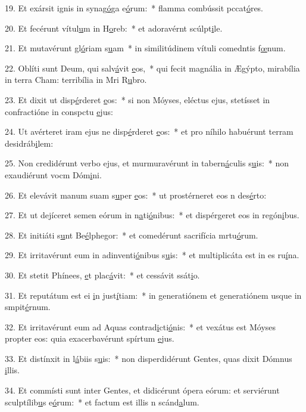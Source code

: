 19. Et exársit ignis in synag\uline{ó}ga e\uline{ó}rum:~* flamma combússit pccat\uline{ó}res.\par 
20. Et fecérunt vítul\uline{u}m in H\uline{o}reb:~* et adoravérnt scúlpt\uline{i}le.\par 
21. Et mutavérunt gl\uline{ó}riam s\uline{u}am~* in similitúdinem vítuli comedntis f\uline{œ}num.\par 
22. Oblíti sunt Deum, qui salv\uline{á}vit \uline{e}os,~* qui fecit magnália in Ægýpto, mirabília in terra Cham: terribília in Mri R\uline{u}bro.\par 
23. Et dixit ut disp\uline{é}rderet \uline{e}os:~* si non Móyses, eléctus ejus, stetísset in confractióne in conspctu \uline{e}jus:\par 
24. Ut avérteret iram ejus ne disp\uline{é}rderet \uline{e}os:~* et pro níhilo habuérunt terram desidráb\uline{i}lem:\par 
25. Non credidérunt verbo ejus, et murmuravérunt in tabern\uline{á}culis s\uline{u}is:~* non exaudiérunt vocm Dóm\uline{i}ni.\par 
26. Et elevávit manum suam s\uline{u}per \uline{e}os:~* ut prostérneret eos n des\uline{é}rto:\par 
27. Et ut dejíceret semen eórum in n\uline{a}ti\uline{ó}nibus:~* et dispérgeret eos in regón\uline{i}bus.\par 
28. Et initiáti s\uline{u}nt Be\uline{é}lphegor:~* et comedérunt sacrifícia mrtu\uline{ó}rum.\par 
29. Et irritavérunt eum in adinventi\uline{ó}nibus s\uline{u}is:~* et multiplicáta est in es ru\uline{í}na.\par 
30. Et stetit Phínees, \uline{e}t plac\uline{á}vit:~* et cessávit ssát\uline{i}o.\par 
31. Et reputátum est ei \uline{i}n just\uline{í}tiam:~* in generatiónem et generatiónem usque in smpit\uline{é}rnum.\par 
32. Et irritavérunt eum ad Aquas contrad\uline{i}cti\uline{ó}nis:~* et vexátus est Móyses propter eos: quia exacerbavérunt spírtum \uline{e}jus.\par 
33. Et distínxit in l\uline{á}biis s\uline{u}is:~* non disperdidérunt Gentes, quas dixit Dómnus \uline{i}llis.\par 
34. Et commísti sunt inter Gentes, et didicérunt ópera eórum: et serviérunt sculptílib\uline{u}s e\uline{ó}rum:~* et factum est illis n scánd\uline{a}lum.\par 
